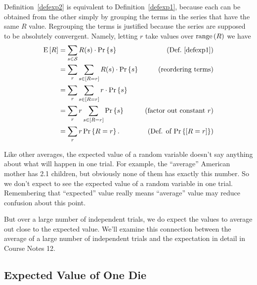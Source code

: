 \documentclass[11pt,twoside]{article}
\begin{document}
Definition~\ref{defexp2} is equivalent to Definition~\ref{defexp1},
because each can be obtained from the other simply by grouping the terms
in the series that have the same $R$ value.  Regrouping the terms is
justified because the series are supposed to be absolutely convergent.
Namely, letting $r$ take values over $\mathop{\textup{range}}\nolimits\left(R\right)$ we have
\begin{align*}
\mathop{\textup{E}}\nolimits\left[R\right] & =  \sum_{s \in \mathcal{S}} R(s) \cdot \mathop{\textup{Pr}}\nolimits\left\{s\right\}
                 & \text{(Def.~\ref{defexp1})}\\
       & =   \sum_{r} \sum_{s \in [R = r]} R(s)
       \cdot \mathop{\textup{Pr}}\nolimits\left\{s\right\} & \text{(reordering terms)}\\
       & =   \sum_{r} \sum_{s \in [R = r]} r
       \cdot \mathop{\textup{Pr}}\nolimits\left\{s\right\} \\
       & =   \sum_{r} r \sum_{s \in [R = r]}
       \mathop{\textup{Pr}}\nolimits\left\{s\right\} & \text{(factor out constant $r$)}\\
       & =   \sum_{r} r \mathop{\textup{Pr}}\nolimits\left\{R = r\right\}. & \text{(Def. of $\mathop{\textup{Pr}}\nolimits\left\{[R=r]\right\}$)}
\end{align*}

Like other averages, the expected value of a random variable doesn't say
anything about what will happen in one trial.  For example, the
``average'' American mother has 2.1 children, but obviously none of them
has exactly this number.  So we don't expect to see the expected value of
a random variable in one trial.  Remembering that ``expected'' value
really means ``average'' value may reduce confusion about this point.

But over a large number of independent trials, we do expect the values to
average out close to the expected value.  We'll examine this connection
between the average of a large number of independent trials and the
expectation in detail in Course Notes 12.

\subsection{Expected Value of One Die}
\end{document}
